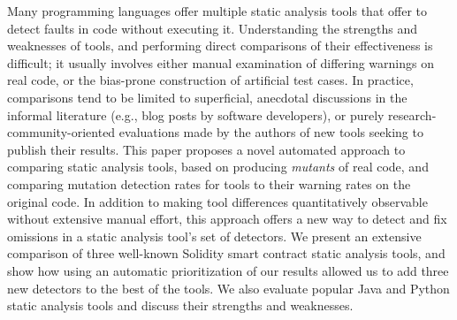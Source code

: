 Many programming languages offer multiple static analysis tools that offer to detect faults in code without executing it.  Understanding the strengths and weaknesses of tools, and performing direct comparisons of their effectiveness is difficult; it usually involves either manual examination of differing warnings on real code, or the bias-prone construction of artificial test cases.  In practice, comparisons tend to be limited to superficial, anecdotal discussions in the informal literature (e.g., blog posts by software developers), or purely research-community-oriented evaluations made by the authors of new tools seeking to publish their results.  This paper proposes a novel automated approach to comparing static analysis tools, based on producing \emph{mutants} of real code, and comparing mutation detection rates for tools to their warning rates on the original code.  In addition to making tool differences quantitatively observable without extensive manual effort, this approach offers a new way to detect and fix omissions in a static analysis tool's set of detectors.  We present an extensive comparison of three well-known Solidity smart contract static analysis tools, and show how using an automatic prioritization of our results allowed us to add three new detectors to the best of the tools.  We also evaluate popular Java and Python static analysis tools and discuss their strengths and weaknesses.